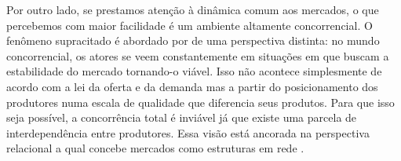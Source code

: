 \documentclass[a4paper, 12pt, openright, oneside, german, french, english, brazil]{abntex2}
\begin{document}


	Por outro lado, se prestamos atenção à dinâmica comum aos mercados, o que percebemos com maior facilidade é um ambiente altamente concorrencial. O fenômeno supracitado é abordado por  de uma perspectiva distinta: no mundo concorrencial, os atores se veem constantemente em situações em que buscam a estabilidade do mercado tornando-o viável. Isso não acontece simplesmente de acordo com a lei da oferta e da demanda mas a partir do posicionamento dos produtores numa escala de qualidade que diferencia seus produtos. Para que isso seja possível, a concorrência total é inviável já que existe uma parcela de interdependência entre produtores. Essa visão está ancorada na perspectiva relacional a qual concebe mercados como estruturas em rede \cite{white2008,white2002markets,lazega2014redes}.
\end{document}

